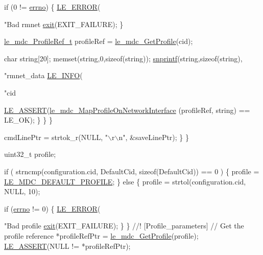 \begin{DoxyCodeInclude}
{{{                        \textcolor{keywordflow}{if} (0 != \hyperlink{supervisor_8c_a0a4ccfdbe1cf7b37afc60d34e748b066}{errno})
                        \{
                            \hyperlink{le__log_8h_a353590f91b3143a7ba3a416ae5a50c3d}{LE\_ERROR}(\textcolor{stringliteral}{"Bad rmnet %
                            \hyperlink{app_stop_client_8c_a310220604a584e112ba8f7aa3dfe23f1}{exit}(EXIT\_FAILURE);
                        \}

                        \hyperlink{le__mdc__interface_8h_a91074d8f0d88c6645e3085dfadf87011}{le\_mdc\_ProfileRef\_t} profileRef = 
      \hyperlink{le__mdc__interface_8h_a638b693cd5f644fa5c24f81e1e36483c}{le\_mdc\_GetProfile}(cid);

                        \textcolor{keywordtype}{char} \textcolor{keywordtype}{string}[20];
                        memset(\textcolor{keywordtype}{string},0,\textcolor{keyword}{sizeof}(\textcolor{keywordtype}{string}));
                        \hyperlink{app_stop_client_8c_a2b6c4b2a795957a91039524b524be480}{snprintf}(\textcolor{keywordtype}{string},\textcolor{keyword}{sizeof}(\textcolor{keywordtype}{string}),\textcolor{stringliteral}{"rmnet\_data%
                        \hyperlink{le__log_8h_a23e6d206faa64f612045d688cdde5808}{LE\_INFO}(\textcolor{stringliteral}{"cid %

                        \hyperlink{le__log_8h_ac0dbbef91dc0fed449d0092ff0557b39}{LE\_ASSERT}(\hyperlink{le__mdc__interface_8h_a56cd547a4e2b9cc98c1f0d052aeb92e6}{le\_mdc\_MapProfileOnNetworkInterface}
      (profileRef, \textcolor{keywordtype}{string}) == LE\_OK);
                    \}
                \}
            \}

            cmdLinePtr = strtok\_r(NULL, \textcolor{stringliteral}{"\(\backslash\)r\(\backslash\)n"}, &saveLinePtr);
        \}
    \}

    uint32\_t profile;

    \textcolor{keywordflow}{if} ( strncmp(configuration.cid, DefaultCid, \textcolor{keyword}{sizeof}(DefaultCid)) == 0 )
    \{
        profile = \hyperlink{le__mdc__interface_8h_abf72eaa8891f7591477e229bb4ad5723}{LE\_MDC\_DEFAULT\_PROFILE};
    \}
    \textcolor{keywordflow}{else}
    \{
        profile = strtol(configuration.cid, NULL, 10);

        \textcolor{keywordflow}{if} (\hyperlink{supervisor_8c_a0a4ccfdbe1cf7b37afc60d34e748b066}{errno} != 0)
        \{
            \hyperlink{le__log_8h_a353590f91b3143a7ba3a416ae5a50c3d}{LE\_ERROR}(\textcolor{stringliteral}{"Bad profile %
            \hyperlink{app_stop_client_8c_a310220604a584e112ba8f7aa3dfe23f1}{exit}(EXIT\_FAILURE);
        \}
    \}
\textcolor{comment}{}
\textcolor{comment}{//! [Profile\_parameters]}
\textcolor{comment}{}
    \textcolor{comment}{// Get the profile reference}
    *profileRefPtr = \hyperlink{le__mdc__interface_8h_a638b693cd5f644fa5c24f81e1e36483c}{le\_mdc\_GetProfile}(profile);
    \hyperlink{le__log_8h_ac0dbbef91dc0fed449d0092ff0557b39}{LE\_ASSERT}(NULL != *profileRefPtr);

}}}}}}}
\end{DoxyCodeInclude}
